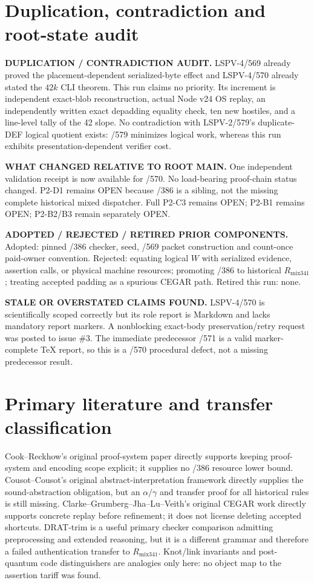 \documentclass[11pt]{article}
\begin{document}
\section*{Duplication, contradiction and root-state audit}
\textbf{DUPLICATION / CONTRADICTION AUDIT.} LSPV-4/569 already proved the placement-dependent serialized-byte effect and LSPV-4/570 already stated the $42k$ CLI theorem.  This run claims no priority.  Its increment is independent exact-blob reconstruction, actual Node v24 OS replay, an independently written exact depadding equality check, ten new hostiles, and a line-level tally of the 42 slope.  No contradiction with LSPV-2/579's duplicate-DEF logical quotient exists: /579 minimizes logical work, whereas this run exhibits presentation-dependent verifier cost.

\textbf{WHAT CHANGED RELATIVE TO ROOT MAIN.} One independent validation receipt is now available for /570.  No load-bearing proof-chain status changed.  P2-D1 remains OPEN because /386 is a sibling, not the missing complete historical mixed dispatcher.  Full P2-C3 remains OPEN; P2-B1 remains OPEN; P2-B2/B3 remain separately OPEN.

\textbf{ADOPTED / REJECTED / RETIRED PRIOR COMPONENTS.} Adopted: pinned /386 checker, seed, /569 packet construction and count-once paid-owner convention.  Rejected: equating logical $W$ with serialized evidence, assertion calls, or physical machine resources; promoting /386 to historical $R_{\mathrm{mix341}}$; treating accepted padding as a spurious CEGAR path.  Retired this run: none.

\textbf{STALE OR OVERSTATED CLAIMS FOUND.} LSPV-4/570 is scientifically scoped correctly but its role report is Markdown and lacks mandatory report markers.  A nonblocking exact-body preservation/retry request was posted to issue \#3.  The immediate predecessor /571 is a valid marker-complete TeX report, so this is a /570 procedural defect, not a missing predecessor result.

\section*{Primary literature and transfer classification}
Cook--Reckhow's original proof-system paper directly supports keeping proof-system and encoding scope explicit; it supplies no /386 resource lower bound.  Cousot--Cousot's original abstract-interpretation framework directly supplies the sound-abstraction obligation, but an $\alpha/\gamma$ and transfer proof for all historical rules is still missing.  Clarke--Grumberg--Jha--Lu--Veith's original CEGAR work directly supports concrete replay before refinement; it does not license deleting accepted shortcuts.  DRAT-trim is a useful primary checker comparison admitting preprocessing and extended reasoning, but it is a different grammar and therefore a failed authentication transfer to $R_{\mathrm{mix341}}$.  Knot/link invariants and post-quantum code distinguishers are analogies only here: no object map to the assertion tariff was found.
\end{document}
